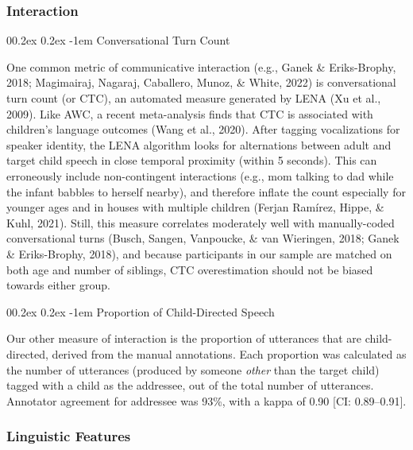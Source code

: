 \documentclass[
  man,floatsintext]{apa6}
\makeatletter
\let\oldparagraph\paragraph
\renewcommand{\paragraph}[1]{\oldparagraph{#1}\mbox{}}
\renewcommand{\paragraph}{\@startsection{paragraph}{4}{\parindent}%
  {0\baselineskip \@plus 0.2ex \@minus 0.2ex}%
  {-1em}%
  {\normalfont\normalsize\bfseries\itshape\typesectitle}}
\makeatother
\begin{document}
\hypertarget{interaction}{%
\subsubsection{Interaction}\label{interaction}}

\hypertarget{conversational-turn-count}{%
\paragraph{Conversational Turn Count}\label{conversational-turn-count}}

One common metric of communicative interaction (e.g., Ganek \& Eriks-Brophy, 2018; Magimairaj, Nagaraj, Caballero, Munoz, \& White, 2022) is conversational turn count (or CTC), an automated measure generated by LENA (Xu et al., 2009). Like AWC, a recent meta-analysis finds that CTC is associated with children's language outcomes (Wang et al., 2020). After tagging vocalizations for speaker identity, the LENA algorithm looks for alternations between adult and target child speech in close temporal proximity (within 5 seconds). This can erroneously include non-contingent interactions (e.g., mom talking to dad while the infant babbles to herself nearby), and therefore inflate the count especially for younger ages and in houses with multiple children (Ferjan Ramírez, Hippe, \& Kuhl, 2021). Still, this measure correlates moderately well with manually-coded conversational turns (Busch, Sangen, Vanpoucke, \& van Wieringen, 2018; Ganek \& Eriks-Brophy, 2018), and because participants in our sample are matched on both age and number of siblings, CTC overestimation should not be biased towards either group.

\hypertarget{proportion-of-child-directed-speech}{%
\paragraph{Proportion of Child-Directed Speech}\label{proportion-of-child-directed-speech}}

Our other measure of interaction is the proportion of utterances that are child-directed, derived from the manual annotations. Each proportion was calculated as the number of utterances (produced by someone \emph{other} than the target child) tagged with a child as the addressee, out of the total number of utterances. Annotator agreement for addressee was 93\%, with a kappa of 0.90 {[}CI: 0.89--0.91{]}.

\hypertarget{linguistic-features}{%
\subsubsection{Linguistic Features}\label{linguistic-features}}
\end{document}
